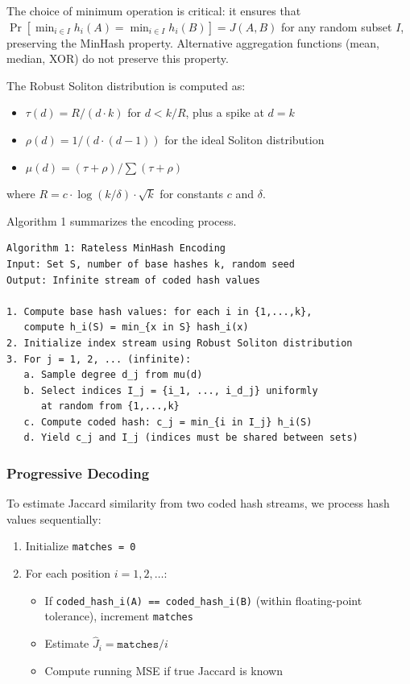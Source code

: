\documentclass[11pt,letterpaper]{article}
\begin{document}
The choice of minimum operation is critical: it ensures that $\Pr[\min_{i \in I} h_i(A) = \min_{i \in I} h_i(B)] = J(A,B)$ for any random subset $I$, preserving the MinHash property. Alternative aggregation functions (mean, median, XOR) do not preserve this property.

The Robust Soliton distribution is computed as:
\begin{itemize}
    \item $\tau(d) = R/(d \cdot k)$ for $d < k/R$, plus a spike at $d = k$
    \item $\rho(d) = 1/(d \cdot (d-1))$ for the ideal Soliton distribution
    \item $\mu(d) = (\tau + \rho) / \sum(\tau + \rho)$
\end{itemize}

where $R = c \cdot \log(k/\delta) \cdot \sqrt{k}$ for constants $c$ and $\delta$.

Algorithm 1 summarizes the encoding process.

\begin{verbatim}
Algorithm 1: Rateless MinHash Encoding
Input: Set S, number of base hashes k, random seed
Output: Infinite stream of coded hash values

1. Compute base hash values: for each i in {1,...,k}, 
   compute h_i(S) = min_{x in S} hash_i(x)
2. Initialize index stream using Robust Soliton distribution
3. For j = 1, 2, ... (infinite):
   a. Sample degree d_j from mu(d)
   b. Select indices I_j = {i_1, ..., i_d_j} uniformly 
      at random from {1,...,k}
   c. Compute coded hash: c_j = min_{i in I_j} h_i(S)
   d. Yield c_j and I_j (indices must be shared between sets)
\end{verbatim}

\subsubsection{Progressive Decoding}

To estimate Jaccard similarity from two coded hash streams, we process hash values sequentially:

\begin{enumerate}
    \item Initialize \texttt{matches = 0}
    \item For each position $i = 1, 2, \ldots$:
    \begin{itemize}
        \item If \texttt{coded\_hash\_i(A) == coded\_hash\_i(B)} (within floating-point tolerance), increment \texttt{matches}
        \item Estimate $\hat{J}_i = \texttt{matches} / i$
        \item Compute running MSE if true Jaccard is known
    \end{itemize}
\end{enumerate}
\end{document}
